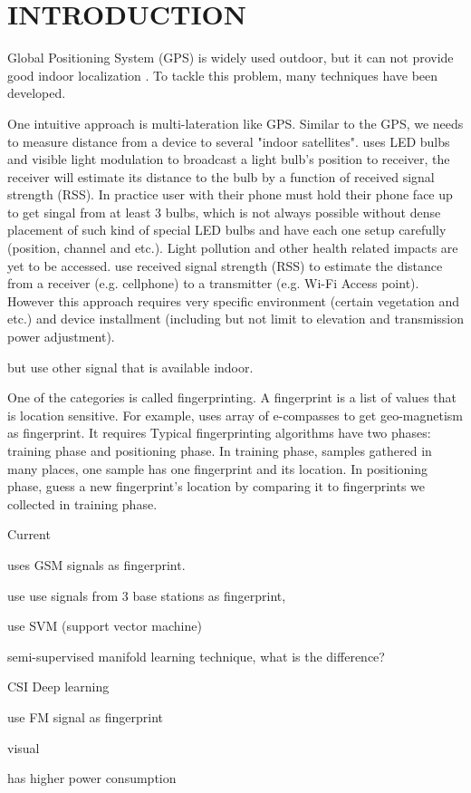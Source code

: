 \chapter{INTRODUCTION}

Global Positioning System (GPS) is widely used outdoor, but it can not provide good indoor localization \cite{pulkkinen2011semi, varshavsky2007gsm}. To tackle this problem, many techniques have been developed. 

One intuitive approach is multi-lateration like GPS. Similar to the GPS, we needs to measure distance from a device to several "indoor satellites". \cite{hu2013pharos} uses LED bulbs and visible light modulation to broadcast a light bulb's position to receiver, the receiver will estimate its distance to the bulb by a function of received signal strength (RSS). In practice user with their phone must hold their phone face up to get singal from at least 3 bulbs, which is not always possible without dense placement of such kind of special LED bulbs and have each one setup carefully (position, channel and etc.). Light pollution and other health related impacts are yet to be accessed. \cite{whitehouse2007practical} use received signal strength (RSS) to estimate the distance from a receiver (e.g. cellphone) to a transmitter (e.g. Wi-Fi Access point). However this approach requires very specific environment (certain vegetation and etc.) and device installment (including but not limit to elevation and transmission power adjustment). 

but use other signal that is available indoor.

 
One of the categories is called fingerprinting. A fingerprint is a list of values that is location sensitive. For example, \cite{chung2011indoor} uses array of e-compasses to get geo-magnetism as fingerprint. It requires  Typical fingerprinting algorithms have two phases: training phase and positioning phase. In training phase, samples gathered in many places, one sample has one fingerprint and its location. In positioning phase, guess a new fingerprint's location by comparing it to fingerprints we collected in training phase. 

Current 


\cite{varshavsky2007gsm} uses GSM signals as fingerprint. 

\cite{bahl2000radar} use use signals from 3 base stations as fingerprint,

\cite{brunato2005statistical} use SVM (support vector machine)

\cite{pulkkinen2011semi}semi-supervised manifold learning technique, what is the difference? 

CSI Deep learning

\cite{chen2012fm} use FM signal as fingerprint

visual

has higher power consumption